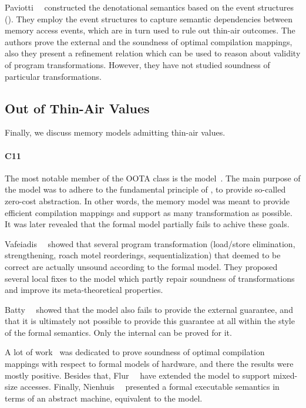 Paviotti~\etal~\cite{Paviotti-al:ESOP20} constructed the 
denotational semantics based on the event structures (\MRD). 
They employ the event structures to capture 
semantic dependencies between memory access events, 
which are in turn used to rule out thin-air outcomes.
The authors prove the external \DRF and 
the soundness of optimal compilation mappings,
also they present a refinement relation which 
can be used to reason about validity of program transformations. 
However, they have not studied soundness of particular transformations. 

\subsection{Out of Thin-Air Values}

Finally, we discuss memory models admitting thin-air values. 

\paragraph{C11}

The most notable member of the OOTA class is the \CMM model~\cite{Batty-al:POPL11}.
The main purpose of the \CMM model was to adhere to the fundamental principle of \CPP, 
\ie to provide so-called zero-cost abstraction. 
In other words, the memory model was meant to provide 
efficient compilation mappings and support as many transformation as possible.
It was later revealed that the formal model partially fails to achive these goals.

Vafeiadis~\etal~\cite{Vafeiadis-al:POPL15} showed that several program transformation 
(load/store elimination, strengthening, roach motel reorderings, sequentialization) 
that deemed to be correct are actually unsound according to the formal model.
They proposed several local fixes to the model which 
partly repair soundness of transformations and improve 
its meta-theoretical properties. 

Batty~\etal~\cite{Batty-al:ESOP15} showed that 
the model also fails to provide the external \DRF guarantee, 
and that it is ultimately not possible to provide this guarantee
at all within the style of the \CMM formal semantics.
Only the internal \DRF can be proved for it. 

A lot of work~\cite{Batty-al:POPL11, Sarkar-al:PLDI12, Batty-al:POPL12, Batty-al:POPL16} 
was dedicated to prove soundness of optimal compilation mappings 
with respect to formal models of hardware, 
and there the results were mostly positive.
Besides that, Flur~\etal~\cite{Flur-al:POPL17} have extended 
the model to support mixed-size accesses.
Finally, Nienhuis~\etal~\cite{Nienhuis-al:OOPSLA16} presented 
a formal executable semantics in terms of an abstract machine, 
equivalent to the \CMM model. 

